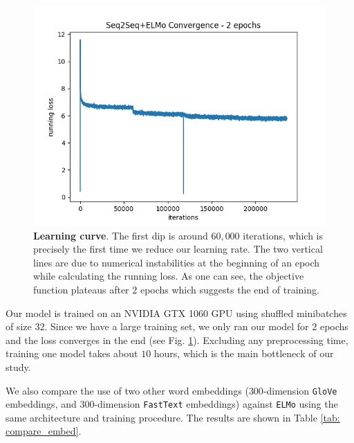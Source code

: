 \begin{figure}
\centering
\includegraphics[width=\linewidth]{figures/convergence.png}
\vspace{-8mm}
\caption{\textbf{Learning curve}. The first dip is around $60,000$ iterations, which is precisely the first time we reduce our learning rate. The two vertical lines are due to numerical instabilities at the beginning of an epoch while calculating the running loss. As one can see, the objective function plateaus after $2$ epochs which suggests the end of training.}
\label{fig: convergence}
\end{figure}

Our model is trained on an NVIDIA GTX 1060 GPU using shuffled minibatches of size $32$. Since we have a large training set, we only ran our model for $2$ epochs and the loss converges in the end (see Fig. \ref{fig: convergence}). Excluding any preprocessing time, training one model takes about $10$ hours, which is the main bottleneck of our study.

We also compare the use of two other word embeddings ($300$-dimension \texttt{GloVe} embeddings, and $300$-dimension \texttt{FastText} embeddings) against \texttt{ELMo} using the same architecture and training procedure. The results are shown in Table \ref{tab: compare_embed}.




